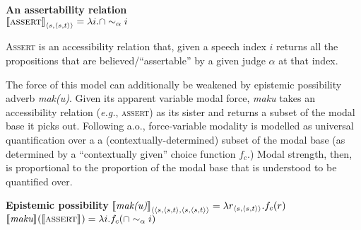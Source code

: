 \pex \textbf{An assertability relation}\\
$ \denote{\textsc{assert}}_{\langle s,\langle s,t\rangle\rangle}
=\lambda i.\cap\sim_\alpha i $

\textsc{\textsc{Assert}} is an accessibility relation that, given a speech index $ i $ returns all the propositions that are believed/``assertable'' by a given judge $ \alpha $ at that index.
\xe%

The force of this model can additionally be weakened by epistemic possibility adverb \textit{mak(u)}. Given its apparent variable modal force, \textit{maku} takes an accessibility relation (\textit{e.g.}, \textsc{assert}) as its sister and returns a subset of the modal base it picks out.  Following \citealt{Matthewson2010,Rullmann2008} a.o., force-variable modality is modelled as universal quantification over a a (contextually-determined) subset of the modal base (as determined by a ``contextually given'' choice function $ f_c $.) Modal strength, then, is proportional to the proportion of the modal base that is understood to be quantified over.


\pex \textbf{Epistemic possibility}
\a$\denote[]{\textit{mak(u)}}_{\langle\langle s,\langle s,t\rangle,\langle s,\langle s,t\rangle\rangle} = \lambda r_{\langle s,\langle s,t\rangle\rangle}.f_c(r)$
\a$ \denote{\textit{maku}}(\denote{\textsc{assert}}) =\lambda i.f_c(\cap\sim_\alpha i)$
\label{sec:epist}



